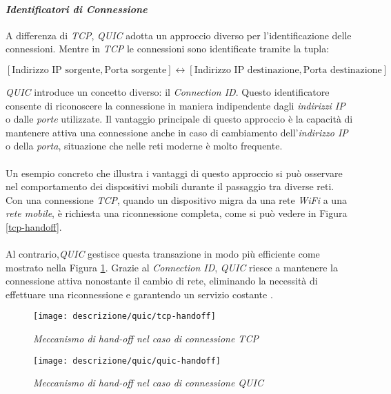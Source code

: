 \paragraph{\textit{Identificatori di Connessione}}
\noindent A differenza di \emph{TCP}, \emph{QUIC} adotta un approccio diverso per l'identificazione delle connessioni. 
Mentre in \emph{TCP} le connessioni sono identificate tramite la tupla:
\begin{center}
\small
$[\text{Indirizzo IP sorgente}, \text{Porta sorgente}] \leftrightarrow [\text{Indirizzo IP destinazione}, \text{Porta destinazione}]$
\end{center}
\emph{QUIC} introduce un concetto diverso: il \emph{Connection ID}. Questo identificatore consente di riconoscere la connessione in maniera indipendente dagli \emph{indirizzi IP} o dalle \emph{porte} utilizzate.
Il vantaggio principale di questo approccio è la capacità di mantenere attiva una connessione anche in caso di cambiamento dell'\emph{indirizzo IP} o della \emph{porta}, situazione che nelle reti moderne è molto frequente.
\\\\
Un esempio concreto che illustra i vantaggi di questo approccio si può osservare nel comportamento dei dispositivi mobili durante il passaggio tra diverse reti.
Con una connessione \emph{TCP}, quando un dispositivo migra da una rete \emph{WiFi} a una \emph{rete mobile}, è richiesta una riconnessione completa, come si può vedere in Figura \ref{tcp-handoff}. 
\\\\
Al contrario,\emph{QUIC} gestisce questa transazione in modo più efficiente come mostrato nella Figura \ref{quic-handoff}. Grazie al \emph{Connection ID}, \emph{QUIC} riesce a mantenere la connessione attiva nonostante il cambio di rete, eliminando la necessità di effettuare una riconnessione e garantendo un servizio costante \cite{site:Explaining-QUIC}.
\begin{figure}[!h]
    \centering
    \begin{minipage}{0.48\textwidth}
        \centering
        \texttt{[image: descrizione/quic/tcp-handoff]}
        \caption{\emph{Meccanismo di hand-off nel caso di connessione TCP}}
        \label{tcp-handoff}
    \end{minipage}
    \hfill
    \begin{minipage}{0.48\textwidth}
        \centering
        \texttt{[image: descrizione/quic/quic-handoff]}
        \caption{\emph{Meccanismo di hand-off nel caso di connessione QUIC}}
        \label{quic-handoff}
    \end{minipage}
\end{figure}

